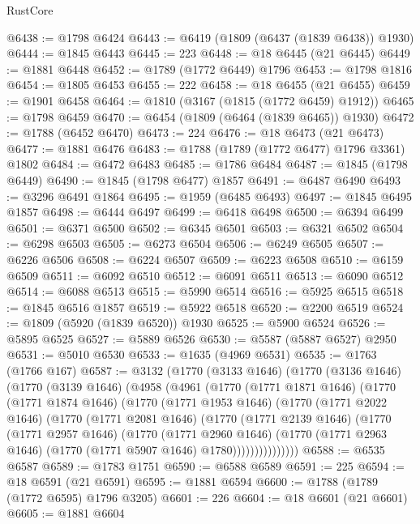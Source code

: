 \begin{lexlean}{RustCore}
\begin{coremodule}
@6438 := @1798 @6424
@6443 := @6419 (@1809 (@6437 (@1839 @6438)) @1930)
@6444 := @1845 @6443
@6445 := 223
@6448 := @18 @6445 (@21 @6445)
@6449 := @1881 @6448
@6452 := @1789 (@1772 @6449) @1796
@6453 := @1798 @1816
@6454 := @1805 @6453
@6455 := 222
@6458 := @18 @6455 (@21 @6455)
@6459 := @1901 @6458
@6464 := @1810 (@3167 (@1815 (@1772 @6459) @1912))
@6465 := @1798 @6459
@6470 := @6454 (@1809 (@6464 (@1839 @6465)) @1930)
@6472 := @1788 (@6452 @6470)
@6473 := 224
@6476 := @18 @6473 (@21 @6473)
@6477 := @1881 @6476
@6483 := @1788 (@1789 (@1772 @6477) @1796 @3361) @1802
@6484 := @6472 @6483
@6485 := @1786 @6484
@6487 := @1845 (@1798 @6449)
@6490 := @1845 (@1798 @6477) @1857
@6491 := @6487 @6490
@6493 := @3296 @6491 @1864
@6495 := @1959 (@6485 @6493)
@6497 := @1845 @6495 @1857
@6498 := @6444 @6497
@6499 := @6418 @6498
@6500 := @6394 @6499
@6501 := @6371 @6500
@6502 := @6345 @6501
@6503 := @6321 @6502
@6504 := @6298 @6503
@6505 := @6273 @6504
@6506 := @6249 @6505
@6507 := @6226 @6506
@6508 := @6224 @6507
@6509 := @6223 @6508
@6510 := @6159 @6509
@6511 := @6092 @6510
@6512 := @6091 @6511
@6513 := @6090 @6512
@6514 := @6088 @6513
@6515 := @5990 @6514
@6516 := @5925 @6515
@6518 := @1845 @6516 @1857
@6519 := @5922 @6518
@6520 := @2200 @6519
@6524 := @1809 (@5920 (@1839 @6520)) @1930
@6525 := @5900 @6524
@6526 := @5895 @6525
@6527 := @5889 @6526
@6530 := @5587 (@5887 @6527) @2950
@6531 := @5010 @6530
@6533 := @1635 (@4969 @6531)
@6535 := @1763 (@1766 @167)
@6587 := @3132
    (@1770
      (@3133 @1646)
      (@1770
        (@3136 @1646)
        (@1770
          (@3139 @1646)
          (@4958
            (@4961
              (@1770
                (@1771 @1871 @1646)
                (@1770
                  (@1771 @1874 @1646)
                  (@1770
                    (@1771 @1953 @1646)
                    (@1770
                      (@1771 @2022 @1646)
                      (@1770
                        (@1771 @2081 @1646)
                        (@1770
                          (@1771 @2139 @1646)
                          (@1770
                            (@1771 @2957 @1646)
                            (@1770
                              (@1771 @2960 @1646)
                              (@1770
                                (@1771 @2963 @1646)
                                (@1770 (@1771 @5907 @1646) @1780)))))))))))))))
@6588 := @6535 @6587
@6589 := @1783 @1751
@6590 := @6588 @6589
@6591 := 225
@6594 := @18 @6591 (@21 @6591)
@6595 := @1881 @6594
@6600 := @1788 (@1789 (@1772 @6595) @1796 @3205)
@6601 := 226
@6604 := @18 @6601 (@21 @6601)
@6605 := @1881 @6604

\end{coremodule}
\end{lexlean}
